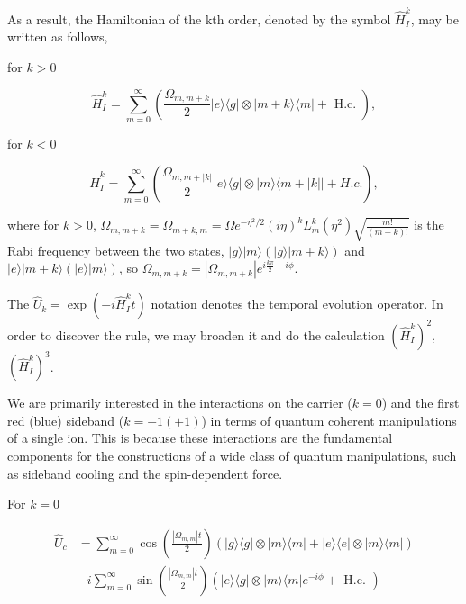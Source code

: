 As a result, the Hamiltonian of the kth order, denoted by the symbol $\hat{H}_I^k$, may be written as follows,

for $k>0$

\begin{equation}
    \hat{H}_I^k=\sum_{m=0}^{\infty}\left(\frac{\Omega_{m, m+k}}{2}|e\rangle\langle g|\otimes| m+k\rangle\langle m|+\text { H.c. }\right),
\end{equation}

for $k<0$

\begin{equation}
    \hat{H}_I^k=\sum_{m=0}^{\infty}\left(\frac{\Omega_{m, m+|k|}}{2}|e\rangle\langle g|\otimes| m\rangle\langle m+|k||+H . c .\right),
\end{equation}

where for $k>0$, $\Omega_{m,m+k}=\Omega_{m+k,m}=\Omega e^{-\eta^2/2}(i\eta)^{k}L_m^{k}(\eta^2)\sqrt{\frac{m!}{(m+k)!}}$ is the Rabi frequency between the two states, $|g\rangle|m\rangle(|g\rangle|m+k\rangle)$ and $|e\rangle|m+k\rangle(|e\rangle|m\rangle)$, so $\Omega_{m, m+k}=\left|\Omega_{m, m+k}\right| e^{i \frac{k \pi}{2}-i \phi}$.

The $\hat{U}_{k}=\exp(-i\hat{H}_I^k t)$ notation denotes the temporal evolution operator. In order to discover the rule, we may broaden it and do the calculation $(\hat{H}_I^k)^2$, $(\hat{H}_I^k)^3$.

We are primarily interested in the interactions on the carrier ($k = 0$) and the first red (blue) sideband ($k=-1(+1)$) in terms of quantum coherent manipulations of a single ion. This is because these interactions are the fundamental components for the constructions of a wide class of quantum manipulations, such as sideband cooling and the spin-dependent force.

For $k=0$

\begin{equation}
    \begin{aligned}
        \hat{U}_c & =\sum_{m=0}^{\infty} \cos \left(\frac{\left|\Omega_{m, m}\right| t}{2}\right)(|g\rangle\langle g|\otimes| m\rangle\langle m|+| e\rangle\langle e|\otimes| m\rangle\langle m|) \\
                  & -i \sum_{m=0}^{\infty} \sin \left(\frac{\left|\Omega_{m, m}\right| t}{2}\right)\left(|e\rangle\langle g|\otimes| m\rangle\langle m| e^{-i \phi}+\text { H.c. }\right)
    \end{aligned}
\end{equation}

